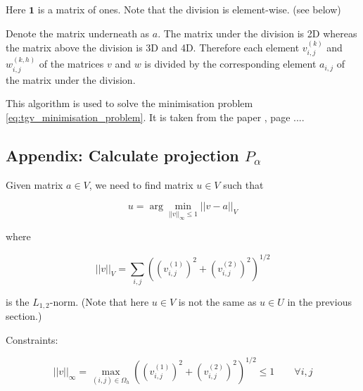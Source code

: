 Here $\mathbf{1}$ is a matrix of ones. 
Note that the division is element-wise. (see below)

Denote the matrix underneath as $a$.
The matrix under the division is 2D whereas the matrix above the division is 3D and 4D.
Therefore each element $v_{i,j}^{(k)}$ and $w_{i,j}^{(k,h)}$ of the matrices $v$ and $w$ is divided by the corresponding element $a_{i,j}$ of the matrix under the division.

\newline


This algorithm is used to solve the minimisation problem \cref{eq:tgv_minimisation_problem}.
It is taken from the paper \cite{recovering_piecewise_smooth_multichannel_images}, page ....



\subsection{Appendix: Calculate projection $P_{\alpha}$}


Given matrix $a \in V$, we need to find matrix $u \in V$ such that

\begin{equation}
    u = \arg \min_{|| v ||_\infty \leq 1} || v - a ||_V
\end{equation}


where

\begin{equation}
    ||v||_V = \sum_{i,j} \left( \left(v_{i,j}^{(1)}\right)^2 + \left(v_{i,j}^{(2)}\right)^2 \right)^{1/2}
\end{equation}

is the $L_{1, 2}$-norm. 
(Note that here $u \in V$ is not the same as $u \in U$ in the previous section.)

Constraints:

\begin{equation}
    ||v||_\infty = \max_{(i,j) \in \Omega_h} \left( \left(v_{i,j}^{(1)}\right)^2 + \left(v_{i,j}^{(2)}\right)^2 \right)^{1/2} \leq 1  \quad  \quad  \forall i, j
\end{equation}




